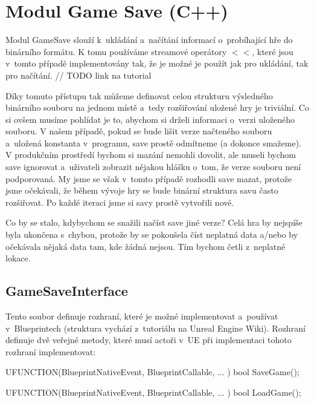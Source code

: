 
\section{Modul Game Save (C++)}

Modul GameSave slouží k~ukládání a~načítání informací o~probíhající hře do binárního formátu. K tomu používáme streamové operátory $<<$, které jsou v~tomto případě implementovány tak, že je možné je použít jak pro ukládání, tak pro načítání. // TODO link na tutorial

Díky tomuto přístupu tak můžeme definovat celou strukturu výsledného binárního souboru na jednom místě a~tedy rozšiřování uložené hry je triviální. Co si ovšem musíme pohlídat je to, abychom si drželi informaci o~verzi uloženého souboru. V našem případě, pokud se bude lišit verze načteného souboru a~uložená konstanta v~programu, save prostě odmítneme (a dokonce smažeme). V produkčním prostředí bychom si mazání nemohli dovolit, ale museli bychom save ignorovat a~uživateli zobrazit nějakou hlášku o~tom, že verze souboru není podporovaná. My jsme se však v~tomto případě rozhodli save mazat, protože jsme očekávali, že během vývoje hry se bude binární struktura savu často rozšiřovat. Po každé iteraci jsme si savy prostě vytvořili nové.

Co by se stalo, kdybychom se snažili načíst save jiné verze? Celá hra by nejspíše byla ukončena s~chybou, protože by se pokoušela číst neplatná data a/nebo by očekávala nějaká data tam, kde žádná nejsou. Tím bychom četli z~neplatné lokace.




\subsection{GameSaveInterface}

Tento soubor definuje rozhraní, které je možné implementovat a~používat v~Blueprintech (struktura vychází z~tutoriálu na Unreal Engine Wiki\citep{ue_interfaces_tut}). Rozhraní definuje dvě veřejné metody, které musí actoři v~UE při implementaci tohoto rozhraní implementovat:

\begin{code}
UFUNCTION(BlueprintNativeEvent, BlueprintCallable, ... )
	bool SaveGame();

UFUNCTION(BlueprintNativeEvent, BlueprintCallable, ... )
	bool LoadGame();
\end{code}

